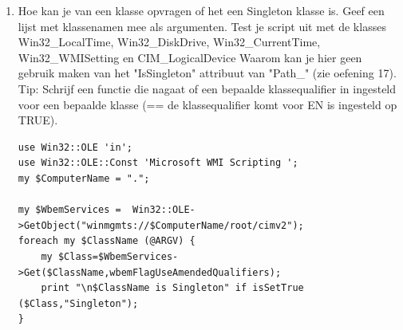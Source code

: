\documentclass[11pt,a4paper]{report}
\begin{document}
\begin{enumerate}[resume]
\begin{lstlisting}
my $ComputerName = ".";
my $WbemServices =  Win32::OLE->GetObject("winmgmts://$ComputerName/root/cimv2");
my $ClassName = $ARGV[0];  #test dit uit met Win32_LocalTime, Win32_DiskDrive en Win32_Product

print "\n$ClassName\n";
my $Class=$WbemServices->Get($ClassName,wbemFlagUseAmendedQualifiers);
#my $Class=$WbemServices->Get($ClassName);  #Geeft minder qualifiers
foreach $Qualifier (in $Class->Qualifiers_){
	$waarde=$Qualifier->Value;
	print "\t",$Qualifier->Name,"(",ref($waarde) eq "ARRAY"  ? "Array=".join (",",@{$waarde}) : $waarde,")\n";
}


#Ophalen van alle instanties kan heel lang duren... vb bij Win32_Product
my $Instances = $Class->Instances_(wbemFlagUseAmendedQualifiers);
my ($Instance)=(in $Instances);

print "\n",$Instance->{Path_}->{relpath},"\n";
foreach $Qualifier (in $Instance->Qualifiers_){ #geeft een kortere lijst van qualifiers
	$waarde=$Qualifier->Value;
	print "\t",$Qualifier->Name,"(",ref($waarde) eq "ARRAY"  ? "Array=".join (",",@{$waarde}) : $waarde,")\n";
}
	\end{lstlisting}
	\item Hoe kan je van een klasse opvragen of het een Singleton klasse is. Geef een lijst met klassenamen mee als argumenten.
	Test je script uit met de klasses Win32\_LocalTime, Win32\_DiskDrive, Win32\_CurrentTime, Win32\_WMISetting en CIM\_LogicalDevice
	Waarom kan je hier geen gebruik maken van het "IsSingleton" attribuut van "Path\_" (zie oefening 17).
	Tip: Schrijf een functie die nagaat of een bepaalde klassequalifier in ingesteld voor een bepaalde klasse (== de klassequalifier komt voor EN is ingesteld op TRUE).
	\begin{lstlisting}
use Win32::OLE 'in';
use Win32::OLE::Const 'Microsoft WMI Scripting ';
my $ComputerName = ".";

my $WbemServices =  Win32::OLE->GetObject("winmgmts://$ComputerName/root/cimv2");
foreach my $ClassName (@ARGV) {
	my $Class=$WbemServices->Get($ClassName,wbemFlagUseAmendedQualifiers);
	print "\n$ClassName is Singleton" if isSetTrue ($Class,"Singleton");
}


\end{lstlisting}
\end{enumerate}
\end{document}
